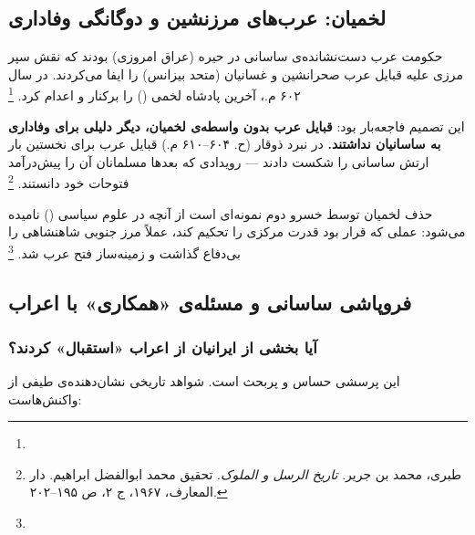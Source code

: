 \subsection{لخمیان: عرب‌های مرزنشین و دوگانگی وفاداری}
\label{subsec:ch04-lakhmids}

 حکومت عرب دست‌نشانده‌ی ساسانی در حیره (عراق امروزی) بودند که نقش سپر مرزی علیه قبایل عرب صحرانشین و غسانیان (متحد بیزانس) را ایفا می‌کردند. در سال ۶۰۲ م.،  آخرین پادشاه لخمی () را بر‌کنار و اعدام کرد.%
\footnote{}

این تصمیم فاجعه‌بار بود: \textbf{قبایل عرب بدون واسطه‌ی لخمیان، دیگر دلیلی برای وفاداری به ساسانیان نداشتند.} در نبرد ذوقار (ح. ۶۰۴–۶۱۰ م.) قبایل عرب برای نخستین بار ارتش ساسانی را شکست دادند — رویدادی که بعدها مسلمانان آن را پیش‌درآمد فتوحات خود دانستند.%
\footnote{طبری، محمد بن جریر. \textit{تاریخ الرسل و الملوک}. تحقیق محمد ابوالفضل ابراهیم. دار المعارف، ۱۹۶۷، ج ۲، ص ۱۹۵--۲۰۲.}

\begin{tcolorbox}[enemybox, title={درس تاریخی: حذف واسطه‌ها و پیامدهای ناخواسته}]
حذف لخمیان توسط خسرو دوم نمونه‌ای است از آنچه در علوم سیاسی  () نامیده می‌شود: عملی که قرار بود قدرت مرکزی را تحکیم کند، عملاً مرز جنوبی شاهنشاهی را بی‌دفاع گذاشت و زمینه‌ساز فتح عرب شد.%
\footnote{}
\end{tcolorbox}

\subsection{فروپاشی ساسانی و مسئله‌ی «همکاری» با اعراب}
\label{subsec:ch04-arab-conquest}

\subsubsection{آیا بخشی از ایرانیان از اعراب «استقبال» کردند؟}

این پرسشی حساس و پربحث است. شواهد تاریخی نشان‌دهنده‌ی طیفی از واکنش‌هاست:

